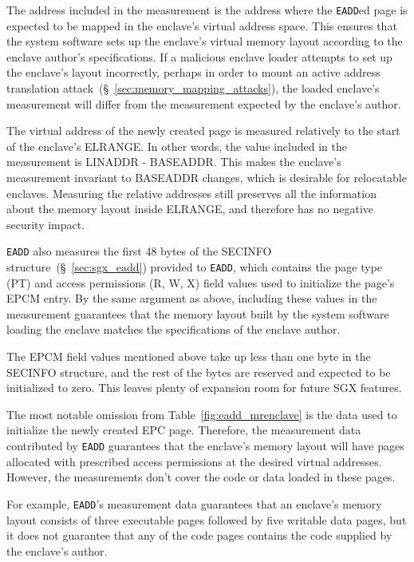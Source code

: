 The address included in the measurement is the address where the
\texttt{EADD}ed page is expected to be mapped in the enclave's virtual address
space. This ensures that the system software sets up the enclave's virtual
memory layout according to the enclave author's specifications. If a malicious
enclave loader attempts to set up the enclave's layout incorrectly, perhaps in
order to mount an active address translation
attack~(\S~\ref{sec:memory_mapping_attacks}), the loaded enclave's measurement
will differ from the measurement expected by the enclave's author.

The virtual address of the newly created page is measured relatively to the
start of the enclave's ELRANGE. In other words, the value included in the
measurement is LINADDR - BASEADDR. This makes the enclave's measurement
invariant to BASEADDR changes, which is desirable for relocatable enclaves.
Measuring the relative addresses still preserves all the information about the
memory layout inside ELRANGE, and therefore has no negative security impact.

\texttt{EADD} also measures the first 48 bytes of the SECINFO
structure~(\S~\ref{sec:sgx_eadd}) provided to \texttt{EADD}, which contains the
page type (PT) and access permissions (R, W, X) field values used to initialize
the page's EPCM entry. By the same argument as above, including these values in
the measurement guarantees that the memory layout built by the system software
loading the enclave matches the specifications of the enclave author.

The EPCM field values mentioned above take up less than one byte in the SECINFO
structure, and the rest of the bytes are reserved and expected to be
initialized to zero. This leaves plenty of expansion room for future SGX
features.

The most notable omission from Table~\ref{fig:eadd_mrenclave} is the data used
to initialize the newly created EPC page. Therefore, the measurement data
contributed by \texttt{EADD} guarantees that the enclave's memory layout
will have pages allocated with prescribed access permissions at the desired
virtual addresses. However, the measurements don't cover the code or data
loaded in these pages.

For example, \texttt{EADD}'s measurement data guarantees that an enclave's
memory layout consists of three executable pages followed by five writable data
pages, but it does not guarantee that any of the code pages contains the
code supplied by the enclave's author.


